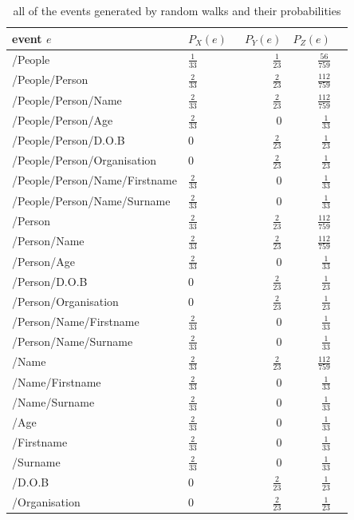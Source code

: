 \begin{table}\footnotesize
\centering
\begin{tabular*}{\textwidth}{l @{\extracolsep{\fill}}lrrr}
\toprule
event $e$		&$P_X(e)$\		&$P_Y(e)$		&$P_{Z}(e)$\\
\midrule
/People & $\frac{1}{33}$ & $\frac{1}{23}$ & $\frac{56}{759}$\\
/People/Person & $\frac{2}{33}$ & $\frac{2}{23}$ & $\frac{112}{759}$\\	
/People/Person/Name & $\frac{2}{33}$ & $\frac{2}{23}$ & $\frac{112}{759}$\\	
/People/Person/Age & $\frac{2}{33}$ & 0 & $\frac{1}{33}$\\
/People/Person/D.O.B & 0 & $\frac{2}{23}$ & $\frac{1}{23}$\\	
/People/Person/Organisation & 0 & $\frac{2}{23}$ & $\frac{1}{23}$\\
/People/Person/Name/Firstname & $\frac{2}{33}$ & 0 & $\frac{1}{33}$\\
/People/Person/Name/Surname & $\frac{2}{33}$ & 0 & $\frac{1}{33}$\\
/Person & $\frac{2}{33}$ & $\frac{2}{23}$ & $\frac{112}{759}$\\
/Person/Name & $\frac{2}{33}$ & $\frac{2}{23}$ & $\frac{112}{759}$\\
/Person/Age & $\frac{2}{33}$ & 0 & $\frac{1}{33}$\\
/Person/D.O.B & 0 & $\frac{2}{23}$ & $\frac{1}{23}$\\
/Person/Organisation & 0 & $\frac{2}{23}$ & $\frac{1}{23}$\\
/Person/Name/Firstname & $\frac{2}{33}$ & 0 & $\frac{1}{33}$\\
/Person/Name/Surname & $\frac{2}{33}$ & 0 & $\frac{1}{33}$\\
/Name & $\frac{2}{33}$ & $\frac{2}{23}$ & $\frac{112}{759}$\\
/Name/Firstname & $\frac{2}{33}$ & 0 & $\frac{1}{33}$\\	
/Name/Surname & $\frac{2}{33}$ & 0 & $\frac{1}{33}$\\
/Age & $\frac{2}{33}$ & 0 & $\frac{1}{33}$\\	
/Firstname & $\frac{2}{33}$ & 0 & $\frac{1}{33}$\\	
/Surname & $\frac{2}{33}$ & 0 & $\frac{1}{33}$\\	
/D.O.B & 0 & $\frac{2}{23}$ & $\frac{1}{23}$\\	
/Organisation & 0 & $\frac{2}{23}$ & $\frac{1}{23}$\\	
\bottomrule
\end{tabular*}
\caption{all of the events generated by random walks and their probabilities}
\label{event_table}
\end{table}

